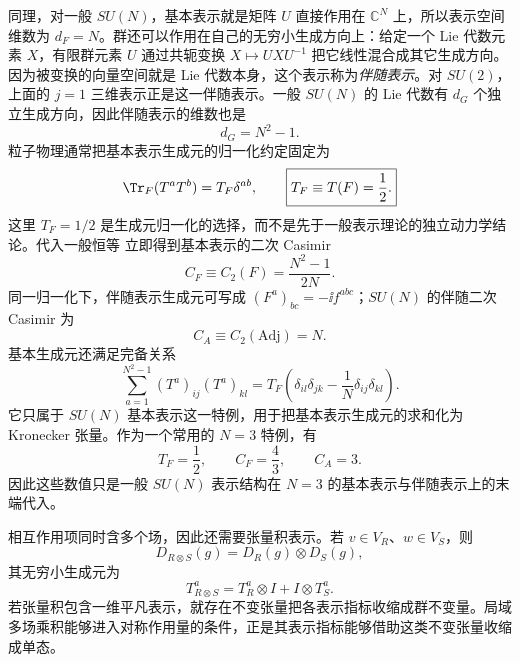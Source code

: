 同理，对一般 $SU(N)$，基本表示就是矩阵 $U$ 直接作用在 $\mathbb C^N$ 上，所以表示空间维数为 $d_F=N$。群还可以作用在自己的无穷小生成方向上：给定一个 Lie 代数元素 $X$，有限群元素 $U$ 通过共轭变换 $X\mapsto UXU^{-1}$ 把它线性混合成其它生成方向。因为被变换的向量空间就是 Lie 代数本身，这个表示称为\emph{伴随表示}。对 $SU(2)$，上面的 $j=1$ 三维表示正是这一伴随表示。一般 $SU(N)$ 的 Lie 代数有 $d_G$ 个独立生成方向，因此伴随表示的维数也是
\begin{equation*}
 d_G=N^2-1.
\end{equation*}
粒子物理通常把基本表示生成元的归一化约定固定为
\begin{equation}
 \Tr_F(T^aT^b)=T_F\delta^{ab},
 \qquad \boxed{T_F\equiv T(F)=\frac12.}
 \label{eq:generator-trace-normalization-dp11}
\end{equation}
这里 $T_F=1/2$ 是生成元归一化的选择，而不是先于一般表示理论的独立动力学结论。代入一般恒等 立即得到基本表示的二次 Casimir
\begin{equation}
 \boxed{C_F\equiv C_2(F)=\frac{N^2-1}{2N}.}
 \label{eq:cf-general-math-dp11}
\end{equation}
同一归一化下，伴随表示生成元可写成 $(F^a)_{bc}=-\ii f^{abc}$；$SU(N)$ 的伴随二次 Casimir 为
\begin{equation}
 \boxed{C_A\equiv C_2(\mathrm{Adj})=N.}
 \label{eq:ca-general-math-dp11}
\end{equation}
基本生成元还满足完备关系
\begin{equation}
 \boxed{
 \sum_{a=1}^{N^2-1}(T^a)_{ij}(T^a)_{kl}
 =T_F\left(\delta_{il}\delta_{jk}-\frac1N\delta_{ij}\delta_{kl}\right).}
 \label{eq:suN-fierz-math-dp68}
\end{equation}
它只属于 $SU(N)$ 基本表示这一特例，用于把基本表示生成元的求和化为 Kronecker 张量。作为一个常用的 $N=3$ 特例，有
\begin{equation*}
 T_F=\frac12,\qquad C_F=\frac43,\qquad C_A=3.
\end{equation*}
因此这些数值只是一般 $SU(N)$ 表示结构在 $N=3$ 的基本表示与伴随表示上的末端代入。

相互作用项同时含多个场，因此还需要张量积表示。若 $v\in V_R$、$w\in V_S$，则
\begin{equation}
 D_{R\otimes S}(g)=D_R(g)\otimes D_S(g),
 \label{eq:tensor-product-rep-dp11}
\end{equation}
其无穷小生成元为
\begin{equation}
 \boxed{
 T_{R\otimes S}^a
 =T_R^a\otimes I+I\otimes T_S^a.}
 \label{eq:tensor-product-generator-dp11}
\end{equation}
若张量积包含一维平凡表示，就存在不变张量把各表示指标收缩成群不变量。局域多场乘积能够进入对称作用量的条件，正是其表示指标能够借助这类不变张量收缩成单态。

